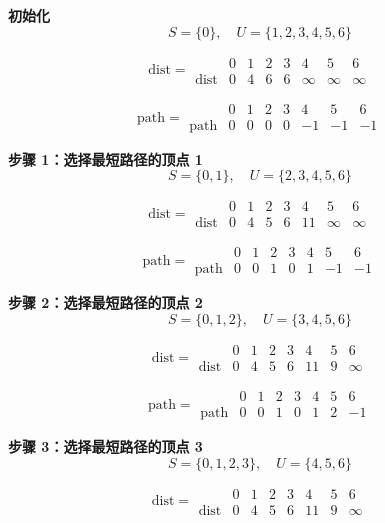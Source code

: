 \documentclass[lang=cn,newtx,10pt,scheme=chinese]{../elegantbook}
\begin{document}
\textbf{初始化}
\[
S = \{0\}, \quad U = \{1, 2, 3, 4, 5, 6\}
\]

\[
\text{dist} =
\begin{array}{c|ccccccc}
 & 0 & 1 & 2 & 3 & 4 & 5 & 6 \\ \hline
\text{dist} & 0 & 4 & 6 & 6 & \infty & \infty & \infty 
\end{array}
\]

\[
\text{path} =
\begin{array}{c|ccccccc}
 & 0 & 1 & 2 & 3 & 4 & 5 & 6 \\ \hline
\text{path} & 0 & 0 & 0 & 0 & -1 & -1 & -1
\end{array}
\]

\textbf{步骤 1：选择最短路径的顶点 1}
\[
S = \{0,1\}, \quad U = \{2, 3, 4, 5, 6\}
\]

\[
\text{dist} =
\begin{array}{c|ccccccc}
 & 0 & 1 & 2 & 3 & 4 & 5 & 6 \\ \hline
\text{dist} & 0 & 4 & 5 & 6 & 11 & \infty & \infty 
\end{array}
\]

\[
\text{path} =
\begin{array}{c|ccccccc}
 & 0 & 1 & 2 & 3 & 4 & 5 & 6 \\ \hline
\text{path} & 0 & 0 & 1 & 0 & 1 & -1 & -1
\end{array}
\]

\textbf{步骤 2：选择最短路径的顶点 2}
\[
S = \{0,1,2\}, \quad U = \{3, 4, 5, 6\}
\]

\[
\text{dist} =
\begin{array}{c|ccccccc}
 & 0 & 1 & 2 & 3 & 4 & 5 & 6 \\ \hline
\text{dist} & 0 & 4 & 5 & 6 & 11 & 9 & \infty
\end{array}
\]

\[
\text{path} =
\begin{array}{c|ccccccc}
 & 0 & 1 & 2 & 3 & 4 & 5 & 6 \\ \hline
\text{path} & 0 & 0 & 1 & 0 & 1 & 2 & -1
\end{array}
\]

\textbf{步骤 3：选择最短路径的顶点 3}
\[
S = \{0,1,2,3\}, \quad U = \{4, 5, 6\}
\]

\[
\text{dist} =
\begin{array}{c|ccccccc}
 & 0 & 1 & 2 & 3 & 4 & 5 & 6 \\ \hline
\text{dist} & 0 & 4 & 5 & 6 & 11 & 9 & \infty
\end{array}
\]
\end{document}
